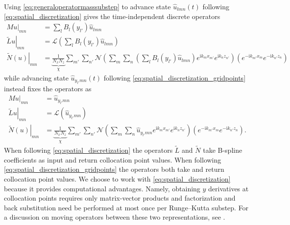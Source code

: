 \documentclass[letterpaper,11pt,nointlimits,reqno,draft]{amsart}
\newcommand{\ii}{\ensuremath{\mathrm{i}}}
\begin{document}
Using \eqref{eq:generaloperatormasssubstep} to advance state
$\hat{u}_{l m n}(t)$ following \eqref{eq:spatial_discretization} gives
the time-independent discrete operators
\begin{subequations}
\begin{align}
   M u\bigr|_{m n}
&= \sum_{l} B_l\!\left(y_{l'}\right)
   \hat{u}_{l m n}
\\
   \left.\tilde{L} u\right|_{m n}
&= \mathscr{L}\left(
     \sum_{l}
     B_l\!\left(y_{l'}\right)
     \hat{u}_{l m n}
   \right)
\\
   \left.\tilde{N}\!\left(u\right)\right|_{m n}
&= \underbrace{\frac{1}{N_x N_z}}_{\chi}
   \sum_{m'} \sum_{n'}
   \mathscr{N}\left(
     \sum_{m}
     \sum_{n}
     \left(
       \sum_{l} B_l\!\left(y_{l'}\right)
       \hat{u}_{l m n}
     \right)
     e^{\ii k_m x_{m'}}e^{\ii k_n z_{n'}}
   \right)
   \left(
     e^{-\ii k_{m'} x_m}e^{-\ii k_{n'} z_n}
   \right)
\end{align}
\end{subequations}
while advancing state $\hat{u}_{y_{l'} m n}(t)$ following
\eqref{eq:spatial_discretization_gridpoints} instead fixes the operators as
\begin{subequations}
\begin{align}
   M u\bigr|_{m n}
&= \hat{u}_{y_{l'} m n}
\\
   \left.\tilde{L} u\right|_{m n}
&= \mathscr{L}\left(\hat{u}_{y_{l'} m n}\right)
\\
   \left.\tilde{N}\!\left(u\right)\right|_{m n}
&= \underbrace{\frac{1}{N_x N_z}}_{\chi}
   \sum_{m'} \sum_{n'}
   \mathscr{N}\left(
     \sum_{m}
     \sum_{n}
     \hat{u}_{y_{l'} m n}
     e^{\ii k_m x_{m'}}e^{\ii k_n z_{n'}}
   \right)
   \left(
     e^{-\ii k_{m'} x_m}e^{-\ii k_{n'} z_n}
   \right)
   .
\end{align}
\end{subequations}
When following \eqref{eq:spatial_discretization} the operators $\tilde{L}$ and
$\tilde{N}$ take B-spline coefficients as input and return collocation point
values.  When following \eqref{eq:spatial_discretization_gridpoints} the
operators both take and return collocation point values.  We choose to work
with \eqref{eq:spatial_discretization} because it provides computational
advantages.  Namely, obtaining $y$ derivatives at collocation points requires
only matrix-vector products and factorization and back substitution need be
performed at most once per Runge--Kutta substep.  For a discussion on moving
operators between these two representations, see
\citet[\textsection{}5.5]{Boyd2001}.
\end{document}
